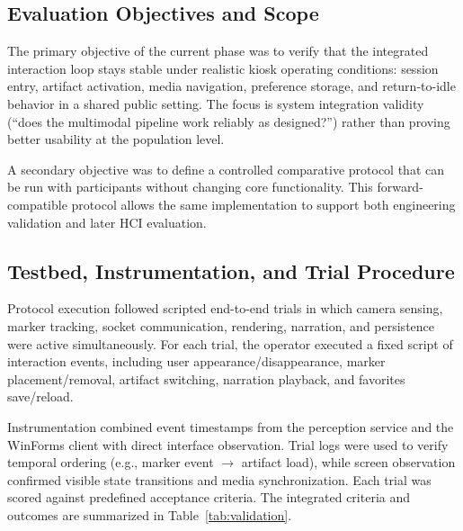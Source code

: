 \documentclass[conference]{IEEEtran}
\begin{document}
\subsection{Evaluation Objectives and Scope}
The primary objective of the current phase was to verify that the integrated interaction loop stays stable under realistic kiosk operating conditions: session entry, artifact activation, media navigation, preference storage, and return-to-idle behavior in a shared public setting. The focus is system integration validity (``does the multimodal pipeline work reliably as designed?'') rather than proving better usability at the population level.

A secondary objective was to define a controlled comparative protocol that can be run with participants without changing core functionality. This forward-compatible protocol allows the same implementation to support both engineering validation and later HCI evaluation.

\subsection{Testbed, Instrumentation, and Trial Procedure}
Protocol execution followed scripted end-to-end trials in which camera sensing, marker tracking, socket communication, rendering, narration, and persistence were active simultaneously. For each trial, the operator executed a fixed script of interaction events, including user appearance/disappearance, marker placement/removal, artifact switching, narration playback, and favorites save/reload.

Instrumentation combined event timestamps from the perception service and the WinForms client with direct interface observation. Trial logs were used to verify temporal ordering (e.g., marker event $\rightarrow$ artifact load), while screen observation confirmed visible state transitions and media synchronization. Each trial was scored against predefined acceptance criteria. The integrated criteria and outcomes are summarized in Table~\ref{tab:validation}.
\end{document}
